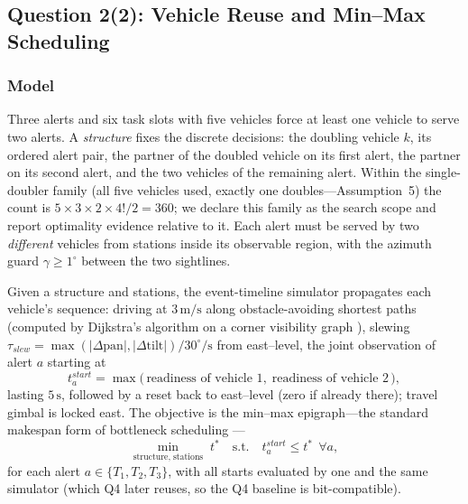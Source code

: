 \subsection{Question 2(2): Vehicle Reuse and Min--Max Scheduling}\label{sec:q22}

\subsubsection{Model}

Three alerts and six task slots with five vehicles force at least one vehicle to serve
two alerts. A \emph{structure} fixes the discrete decisions: the doubling vehicle
$k$, its ordered alert pair, the partner of the doubled vehicle on its first alert, the
partner on its second alert, and the two vehicles of the remaining alert. Within the
single-doubler family (all five vehicles used, exactly one doubles---Assumption~5) the
count is $5\times3\times2\times4!/2=360$; we declare this family as the search scope and
report optimality evidence relative to it. Each alert must be served by two
\emph{different} vehicles from stations inside its observable region, with the azimuth
guard $\gamma\ge1^\circ$ between the two sightlines.

Given a structure and stations, the event-timeline simulator propagates each vehicle's
sequence: driving at $3\,\mathrm{m}/\mathrm{s}$ along obstacle-avoiding shortest paths
(computed by Dijkstra's algorithm on a corner visibility graph
\cite{dijkstra1959,cormen2009}),
slewing $\tau_{slew}=\max(|\Delta\mathrm{pan}|,|\Delta\mathrm{tilt}|)/30^\circ\mathrm{/s}$
from east--level, the joint observation of alert $a$ starting at
\begin{equation}\label{eq:joint}
t^{start}_a=\max\bigl(\,\text{readiness of vehicle 1},\;\text{readiness of vehicle 2}\,\bigr),
\end{equation}
lasting $5\,\mathrm{s}$, followed by a reset back to east--level (zero if already there);
travel gimbal is locked east. The objective is the min--max epigraph---the standard
makespan form of bottleneck scheduling \cite{pinedo2023,boyd2004}---
\begin{equation}\label{eq:minmax}
\min_{\text{structure},\;\text{stations}}\; t^{*}\quad
\text{s.t.}\quad t^{start}_a\le t^{*}\ \ \forall a,
\end{equation}
for each alert $a\in\{T_1,T_2,T_3\}$, with all starts evaluated by one and the same
simulator (which Q4 later reuses, so the Q4 baseline is bit-compatible).

